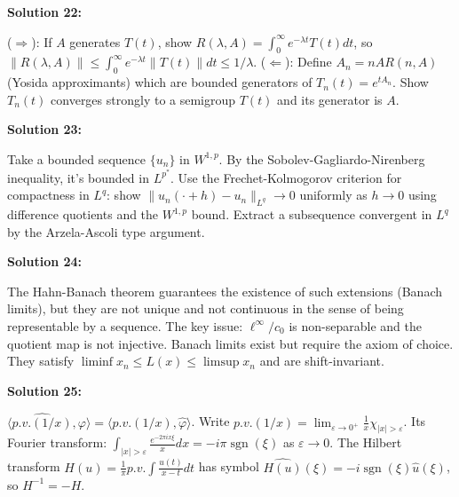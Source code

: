 \documentclass[12pt,a4paper]{exam}
\begin{document}
\vspace{0.5cm}

\textbf{Solution 22:}

($\Rightarrow$): If $A$ generates $T(t)$, show $R(\lambda,A) = \int_0^\infty e^{-\lambda t} T(t) dt$, so $\|R(\lambda,A)\| \leq \int_0^\infty e^{-\lambda t} \|T(t)\| dt \leq 1/\lambda$. ($\Leftarrow$): Define $A_n = nAR(n,A)$ (Yosida approximants) which are bounded generators of $T_n(t) = e^{t A_n}$. Show $T_n(t)$ converges strongly to a semigroup $T(t)$ and its generator is $A$.

\vspace{0.5cm}

\textbf{Solution 23:}

Take a bounded sequence $\{u_n\}$ in $W^{1,p}$. By the Sobolev-Gagliardo-Nirenberg inequality, it's bounded in $L^{p^*}$. Use the Frechet-Kolmogorov criterion for compactness in $L^q$: show $\|u_n(\cdot + h) - u_n\|_{L^q} \to 0$ uniformly as $h \to 0$ using difference quotients and the $W^{1,p}$ bound. Extract a subsequence convergent in $L^q$ by the Arzela-Ascoli type argument.

\vspace{0.5cm}

\textbf{Solution 24:}

The Hahn-Banach theorem guarantees the existence of such extensions (Banach limits), but they are not unique and not continuous in the sense of being representable by a sequence. The key issue: $\ell^\infty / c_0$ is non-separable and the quotient map is not injective. Banach limits exist but require the axiom of choice. They satisfy $\liminf x_n \leq L(x) \leq \limsup x_n$ and are shift-invariant.

\vspace{0.5cm}

\textbf{Solution 25:}

$\langle \widehat{p.v.(1/x)}, \varphi \rangle = \langle p.v.(1/x), \widehat{\varphi} \rangle$. Write $p.v.(1/x) = \lim_{\varepsilon \to 0^+} \frac{1}{x} \chi_{|x|>\varepsilon}$. Its Fourier transform: $\int_{|x|>\varepsilon} \frac{e^{-2\pi i x \xi}}{x} dx = -i\pi \operatorname{sgn}(\xi)$ as $\varepsilon \to 0$. The Hilbert transform $H(u) = \frac{1}{\pi} p.v. \int \frac{u(t)}{x-t} dt$ has symbol $\widehat{H(u)}(\xi) = -i \operatorname{sgn}(\xi) \widehat{u}(\xi)$, so $H^{-1} = -H$.

\vspace{0.5cm}
\end{document}
